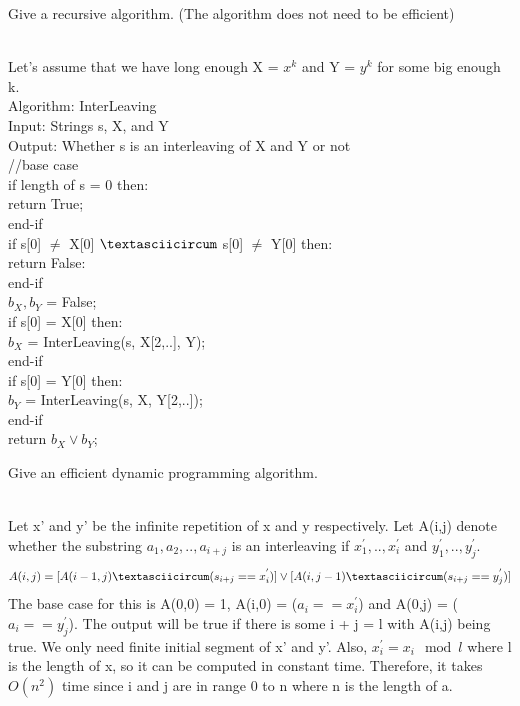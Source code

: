 \documentclass[solutionorbox,answers]{exam}
\begin{document}
\begin{questions}
\begin{parts}
  \item Give a recursive algorithm. (The algorithm does not need to be efficient)
  \begin{solutionbox}{} \vspace{1em} \\
  Let's assume that we have long enough X = $x^{k}$ and Y = $y^{k}$ for some big enough k.\\
  Algorithm: InterLeaving\\
  Input: Strings s, X, and Y\\
  Output: Whether s is an interleaving of X and Y or not\\
  //base case\\
  if length of s = 0 then:\\
    return True;\\
  end-if\\
  if s[0] $\neq$ X[0] $\textasciicircum$ s[0] $\neq$ Y[0] then:\\
    return False:\\
  end-if\\
  $b_{X}, b_{Y}$ = False;\\
  if s[0] = X[0] then:\\
    $b_{X}$ = InterLeaving(s, X[2,..], Y);\\
  end-if\\
  if s[0] = Y[0] then:\\
    $b_{Y}$ = InterLeaving(s, X, Y[2,..]);\\
  end-if\\
  return $b_{X} \vee b_{Y}$;
  \end{solutionbox}
  
  \item Give an efficient dynamic programming algorithm.
  \begin{solutionbox}{} \vspace{1em} \\
  Let x' and y' be the infinite repetition of x and y respectively. Let A(i,j) denote whether the substring $a_{1}, a_{2},..,a_{i+j}$ is an interleaving if $x_{1}^{'},..,x_{i}^{'}$ and $y_{1}^{'},..,y_{j}^{'}$.
  \[ A(i,j) = [A(i-1, j) \textasciicircum (s_{i+j} == x_{i}^{'})] \vee [A(i, j-1) \textasciicircum (s_{i+j} == y_{j}^{'})]\]
  The base case for this is A(0,0) = 1, A(i,0) = ($a_{i} == x_{i}^{'}$) and A(0,j) = ($a_{i} == y_{j}^{'}$). The output will be true if there is some i + j = l with A(i,j) being true. We only need finite initial segment of x' and y'. Also, $x_{i}^{'} = x_{i} \mod{l}$ where l is the length of x, so it can be computed in constant time. Therefore, it takes $O(n^2)$ time since i and j are in range 0 to n where n is the length of a. 
  \end{solutionbox}
 

\end{parts}
\end{questions}
\end{document}
